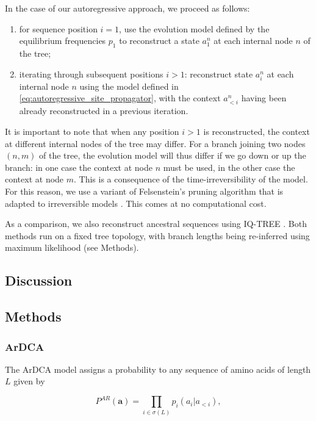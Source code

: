 In the case of our autoregressive approach, we proceed as follows: 
\begin{enumerate}[label=\emph{\roman*}]	
	\item for sequence position $i=1$, use the evolution model defined by the equilibrium frequencies $p_1$ to reconstruct a state $a^n_1$ at each internal node $n$ of the tree;
	\item iterating through subsequent positions $i > 1$: reconstruct state $a^n_i$ at each internal node $n$ using the model defined in \eqref{eq:autoregressive_site_propagator}, with the context $a^n_{<i}$ having been already reconstructed in a previous iteration. 
\end{enumerate}
It is important to note that when any position $i>1$ is reconstructed, the context at different internal nodes of the tree may differ. 
For a branch joining two nodes $(n, m)$ of the tree, the evolution model will thus differ if we go down or up the branch: in one case the context at node $n$ must be used, in the other case the context at node $m$. 
This is a consequence of the time-irreversibility of the model. 
For this reason, we use a variant of Felsenstein's pruning algorithm that is adapted to irreversible models \cite{boussau_efficientlikelihoodcomputations_2006}. 
This comes at no computational cost. 

As a comparison, we also reconstruct ancestral sequences using IQ-TREE \cite{minh_iqtreenewmodels_2020}. 
Both methods run on a fixed tree topology, with branch lengths being re-inferred using maximum likelihood (see Methods). 



\subsection{Discussion}

\subsection{Methods} %
\label{sub:methods}

\subsubsection{ArDCA}

The ArDCA model assigns a probability to any sequence of amino acids of length $L$ given by 

\begin{equation}
	\label{eq:autoregressive_def_methods}
	P^{AR}(\mathbf{a}) = \prod_{i \in \sigma(L)} p_i(a_i \vert a_{<i}),
\end{equation}

